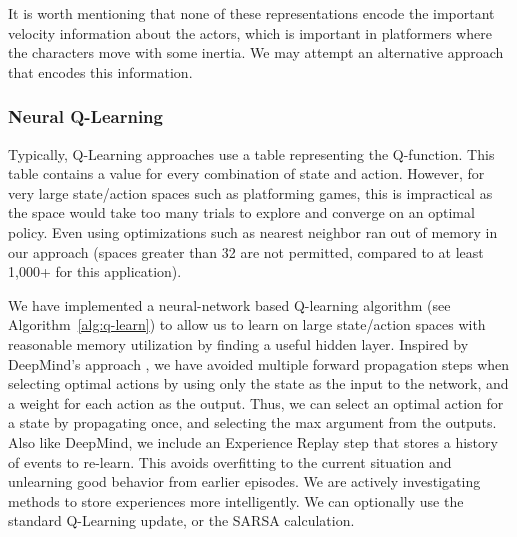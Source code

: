 \documentclass{article}
\begin{document}
It is worth mentioning that none of these representations encode the important velocity information about the actors, which is important in platformers where the characters move with some inertia. We may attempt an alternative approach that encodes this information.

\subsubsection{Neural Q-Learning}

Typically, Q-Learning approaches use a table representing the Q-function. This table contains a value for every combination of state and action. However, for very large state/action spaces such as platforming games, this is impractical as the space would take too many trials to explore and converge on an optimal policy. Even using optimizations such as nearest neighbor ran out of memory in our approach (spaces greater than 32 are not permitted, compared to at least 1,000+ for this application). 

We have implemented a neural-network based Q-learning algorithm (see Algorithm~\ref{alg:q-learn}) to allow us to learn on large state/action spaces with reasonable memory utilization by finding a useful hidden layer. Inspired by DeepMind's approach \cite{Mnih13}, we have avoided multiple forward propagation steps when selecting optimal actions by using only the state as the input to the network, and a weight for each action as the output. Thus, we can select an optimal action for a state by propagating once, and selecting the max argument from the outputs. Also like DeepMind, we include an Experience Replay step that stores a history of events to re-learn. This avoids overfitting to the current situation and unlearning good behavior from earlier episodes. We are actively investigating methods to store experiences more intelligently. We can optionally use the standard Q-Learning update, or the SARSA calculation.
\end{document}
